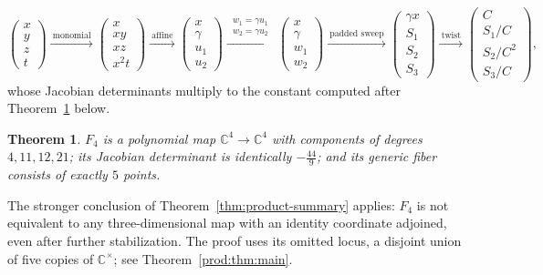 \documentclass[11pt]{article}
\numberwithin{equation}{section}
\theoremstyle{plain}
\newtheorem{theorem}{Theorem}[section]
\theoremstyle{definition}
\theoremstyle{remark}
\newcommand{\C}{\mathbb{C}}
\begin{document}
\[
\begin{pmatrix}x\\ y\\ z\\ t\end{pmatrix}
\xrightarrow{\ \text{monomial}\ }
\begin{pmatrix}x\\ xy\\ xz\\ x^2t\end{pmatrix}
\xrightarrow{\ \text{affine}\ }
\begin{pmatrix}x\\ \gamma\\ u_1\\ u_2\end{pmatrix}
\xrightarrow{\ \substack{w_1=\gamma u_1\\[1pt] w_2=\gamma u_2}\ }
\begin{pmatrix}x\\ \gamma\\ w_1\\ w_2\end{pmatrix}
\xrightarrow{\ \text{padded sweep}\ }
\begin{pmatrix}\gamma x\\ S_1\\ S_2\\ S_3\end{pmatrix}
\xrightarrow{\ \text{twist}\ }
\begin{pmatrix}C\\ S_1/C\\ S_2/C^2\\ S_3/C\end{pmatrix},
\]
whose Jacobian determinants multiply to the constant computed after
Theorem~\ref{thm:F4} below.

\begin{theorem}\label{thm:F4}
$F_4$ is a polynomial map $\C^4\to\C^4$ with components of degrees $4,11,12,21$;
its Jacobian determinant is identically $-\tfrac{44}{9}$; and its generic fiber
consists of exactly $5$ points.
\end{theorem}

The stronger conclusion of Theorem~\ref{thm:product-summary} applies:
$F_4$ is not equivalent to any three-dimensional map with an identity
coordinate adjoined, even after further stabilization. The proof uses
its omitted locus, a disjoint union of five copies of $\C^\times$;
see Theorem~\ref{prod:thm:main}.
\end{document}
